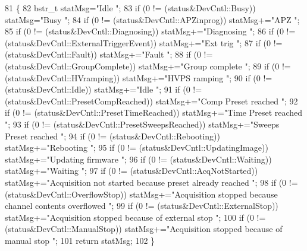 \begin{DoxyCode}
81                                                    \{
82         bstr\_t statMsg=\textcolor{stringliteral}{"Idle "};
83         \textcolor{keywordflow}{if} (0 != (status&DevCntl::Busy)) statMsg=\textcolor{stringliteral}{"Busy "};
84         \textcolor{keywordflow}{if} (0 != (status&DevCntl::APZinprog)) statMsg+=\textcolor{stringliteral}{"APZ "};
85         \textcolor{keywordflow}{if} (0 != (status&DevCntl::Diagnosing)) statMsg+=\textcolor{stringliteral}{"Diagnosing "};
86         \textcolor{keywordflow}{if} (0 != (status&DevCntl::ExternalTriggerEvent)) statMsg+=\textcolor{stringliteral}{"Ext trig "};
87         \textcolor{keywordflow}{if} (0 != (status&DevCntl::Fault)) statMsg+=\textcolor{stringliteral}{"Fault "};
88         \textcolor{keywordflow}{if} (0 != (status&DevCntl::GroupComplete)) statMsg+=\textcolor{stringliteral}{"Group complete "};
89         \textcolor{keywordflow}{if} (0 != (status&DevCntl::HVramping)) statMsg+=\textcolor{stringliteral}{"HVPS ramping "};
90         \textcolor{keywordflow}{if} (0 != (status&DevCntl::Idle)) statMsg+=\textcolor{stringliteral}{"Idle "};
91         \textcolor{keywordflow}{if} (0 != (status&DevCntl::PresetCompReached)) statMsg+=\textcolor{stringliteral}{"Comp Preset reached "};
92         \textcolor{keywordflow}{if} (0 != (status&DevCntl::PresetTimeReached)) statMsg+=\textcolor{stringliteral}{"Time Preset reached "};
93         \textcolor{keywordflow}{if} (0 != (status&DevCntl::PresetSweepsReached)) statMsg+=\textcolor{stringliteral}{"Sweeps Preset reached "};
94         \textcolor{keywordflow}{if} (0 != (status&DevCntl::Rebooting)) statMsg+=\textcolor{stringliteral}{"Rebooting "};
95         \textcolor{keywordflow}{if} (0 != (status&DevCntl::UpdatingImage)) statMsg+=\textcolor{stringliteral}{"Updating firmware "};
96         \textcolor{keywordflow}{if} (0 != (status&DevCntl::Waiting)) statMsg+=\textcolor{stringliteral}{"Waiting "};
97         \textcolor{keywordflow}{if} (0 != (status&DevCntl::AcqNotStarted)) statMsg+=\textcolor{stringliteral}{"Acquisition not started because preset already
       reached "};
98         \textcolor{keywordflow}{if} (0 != (status&DevCntl::OverflowStop)) statMsg+=\textcolor{stringliteral}{"Acquisition stopped because channel contents
       overflowed "};
99         \textcolor{keywordflow}{if} (0 != (status&DevCntl::ExternalStop)) statMsg+=\textcolor{stringliteral}{"Acquisition stopped because of external stop "};
100         \textcolor{keywordflow}{if} (0 != (status&DevCntl::ManualStop)) statMsg+=\textcolor{stringliteral}{"Acquisition stopped because of manual stop "};
101         \textcolor{keywordflow}{return} statMsg;
102     \}
\end{DoxyCode}
\mbox{\label{class_utilities_aae385aedbefa8efffbea68f63569f444_aae385aedbefa8efffbea68f63569f444}} 
